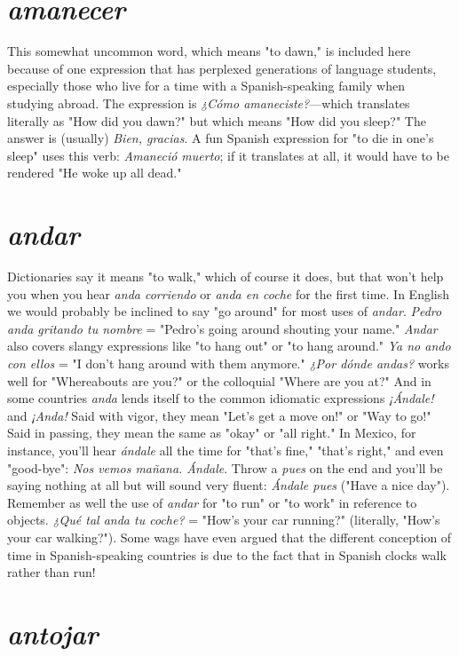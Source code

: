 \section{\emph{amanecer}}

This somewhat uncommon word, which means "to dawn," is
included here because of one expression that has perplexed generations
of language students, especially those who live for a time with a
Spanish-speaking family when studying abroad. The expression is
\emph{¿Cómo amaneciste?}---which translates literally as "How did you
dawn?" but which means "How did you sleep?" The answer is (usually) \emph{Bien, gracias}. A fun Spanish expression for "to die in one's sleep"
uses this verb: \emph{Amaneció muerto}; if it translates at all, it would have
to be rendered "He woke up all dead."

\section{\emph{andar}}

Dictionaries say it means "to walk," which of course it does,
but that won't help you when you hear \emph{anda corriendo} or \emph{anda en
coche} for the first time. In English we would probably be inclined
to say "go around" for most uses of \emph{andar}. \emph{Pedro anda gritando tu
nombre} = "Pedro's going around shouting your name." \emph{Andar} also
covers slangy expressions like "to hang out" or "to hang around." \emph{Ya
no ando con ellos} = "I don't hang around with them anymore." \emph{¿Por
dónde andas?} works well for "Whereabouts are you?" or the colloquial
"Where are you at?" And in some countries \emph{anda} lends itself to the
common idiomatic expressions \emph{¡Ándale!} and \emph{¡Anda!} Said with vigor,
they mean "Let's get a move on!" or "Way to go!" Said in passing, they
mean the same as "okay" or "all right." In Mexico, for instance, you'll
hear \emph{ándale} all the time for "that's fine," "that's right," and even
"good-bye": \emph{Nos vemos mañana. Ándale}. Throw a \emph{pues} on the end
and you'll be saying nothing at all but will sound very fluent: \emph{Ándale
pues} ("Have a nice day"). Remember as well the use of \emph{andar} for "to
run" or "to work" in reference to objects. \emph{¿Qué tal anda tu coche?} =
"How's your car running?" (literally, "How's your car walking?").
Some wags have even argued that the different conception of time in
Spanish-speaking countries is due to the fact that in Spanish clocks
walk rather than run!

\section{\emph{antojar}}

